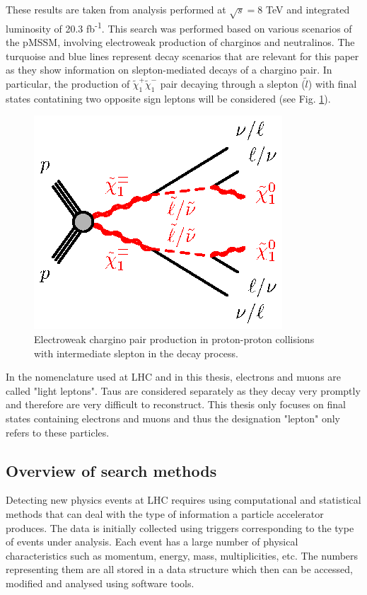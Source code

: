 These results are taken from \citep{atlas2015search} analysis performed at $\sqrt{s}=$8 TeV and integrated luminosity of 20.3 fb\textsuperscript{-1}. This search was performed based on various scenarios of the pMSSM, involving electroweak production of charginos and neutralinos. The turquoise and blue lines represent decay scenarios that are relevant for this paper as they show information on slepton-mediated decays of a chargino pair. 
In particular, the production of $\tilde{\chi}^{+}_{1}\tilde{\chi}^{-}_{1}$ pair decaying through a slepton ($\tilde{l}$) with final states contatining two opposite sign leptons will be considered (see Fig. \ref{fig:EWchargino}). 
\begin{figure}[!h]
  \centering   	
  	\captionsetup{width=0.8\textwidth}
	\includegraphics[]{Chap2/C1C1-llvvN1N1-slsnu}	
\caption[Optional caption for list of figures]{Electroweak chargino pair production in proton-proton collisions with intermediate slepton in the decay process.}\label{fig:EWchargino}
\end{figure}  

In the nomenclature used at LHC and in this thesis, electrons and muons are called "light leptons". Taus are considered separately as they decay very promptly and therefore are very difficult to reconstruct. This thesis only focuses on final states containing electrons and muons and thus the designation "lepton" only refers to these particles.  



\subsection{Overview of search methods}
Detecting new physics events at LHC requires using computational and statistical methods that can deal with the type of information a particle accelerator produces. The data is initially collected using triggers corresponding to the type of events under analysis. Each event has a large number of physical characteristics such as momentum, energy, mass, multiplicities, etc. The numbers representing them are all stored in a data structure which then can be accessed, modified and analysed using software tools. 

